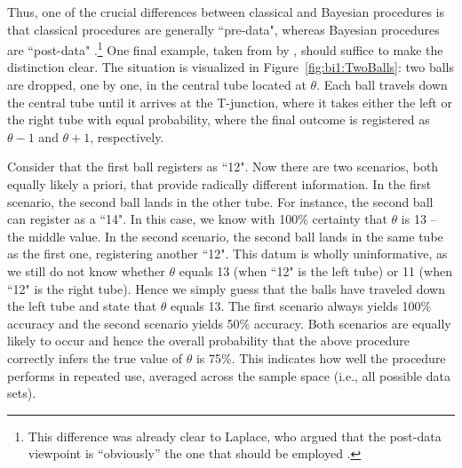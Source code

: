 Thus, one of the crucial differences between classical and Bayesian procedures is that classical procedures are generally ``pre-data", whereas Bayesian procedures are ``post-data" \cite{Jaynes2003}.\footnote{This difference was already clear to Laplace, who argued that the post-data viewpoint is ``obviously'' the one that should be employed \cite[p. 82]{Gillispie1997}. } One final example, taken from by , should suffice to make the distinction clear. The situation is visualized in Figure~\ref{fig:bi1:TwoBalls}: two balls are dropped, one by one, in the central tube located at $\theta$. Each ball travels down the central tube until it arrives at the T-junction, where it takes either the left or the right tube with equal probability, where the final outcome is registered as $\theta-1$ and $\theta+1$, respectively.

Consider that the first ball registers as ``12". Now there are two scenarios, both equally likely a priori, that provide radically different information. In the first scenario, the second ball lands in the other tube. For instance, the second ball can register as a ``14". In this case, we know with 100\% certainty that $\theta$ is 13 -- the middle value. In the second scenario, the second ball lands in the same tube as the first one, registering another ``12". This datum is wholly uninformative, as we still do not know whether $\theta$ equals 13 (when ``12" is the left tube) or 11 (when ``12" is the right tube). Hence we simply guess that the balls have traveled down the left tube and state that $\theta$ equals 13. The first scenario always yields 100\% accuracy and the second scenario yields 50\% accuracy. Both scenarios are equally likely to occur and hence the overall probability that the above procedure correctly infers the true value of $\theta$ is 75\%. This indicates how well the procedure performs in repeated use, averaged across the sample space (i.e., all possible data sets).

